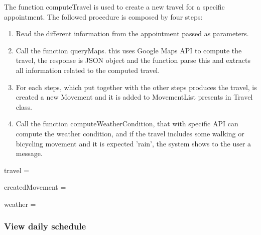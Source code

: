 The function computeTravel is used to create a new travel for a specific appointment.
The followed procedure is composed by four steps:
\begin{enumerate}
	\item Read the different information from the appointment passed as parameters.
	\item Call the function queryMaps. this uses Google Maps API to compute the travel, the response is JSON object and the function parse this and extracts all information related to the computed travel.
	\item For each steps, which put together with the other steps produces the travel, is created a new Movement and it is added to MovementList presents in Travel class.
	\item Call the function computeWeatherCondition, that with specific API can compute the weather condition, and if the travel includes some walking or bicycling movement and it is expected 'rain', the system shows to the user a message.
\end{enumerate}

\begin{algorithmic}
		
		\State {}
		\State {}
		\State {}
		\State {}
		\State {}
		
		\State travel =  
		
			\State createdMovement = 
			\State {}
		\EndFor
		
		weather = 
			\State {}
		\EndIf
	\EndFunction
\end{algorithmic}


\subsubsection{View daily schedule}

